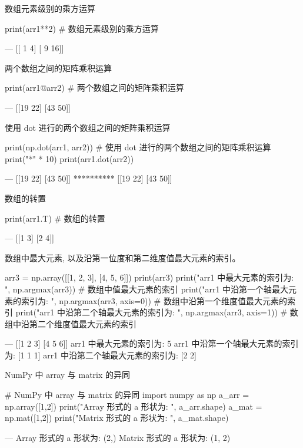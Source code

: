 数组元素级别的乘方运算 

\begin{python}
print(arr1**2)     # 数组元素级别的乘方运算 

---
[[ 1  4]
 [ 9 16]]
\end{python}

两个数组之间的矩阵乘积运算

\begin{python}
print(arr1@arr2)     # 两个数组之间的矩阵乘积运算

---
[[19 22]
 [43 50]]
\end{python}

使用 dot 进行的两个数组之间的矩阵乘积运算

\begin{python}
print(np.dot(arr1, arr2))   # 使用 dot 进行的两个数组之间的矩阵乘积运算
print("*" * 10)
print(arr1.dot(arr2))

---
[[19 22]
 [43 50]]
**********
[[19 22]
 [43 50]]
\end{python}

数组的转置

\begin{python}
print(arr1.T)      # 数组的转置

---
[[1 3]
 [2 4]]
\end{python}

数组中最大元素, 以及沿第一位度和第二维度值最大元素的索引。

\begin{python}
arr3 = np.array([[1, 2, 3], [4, 5, 6]])
print(arr3)
print("arr1 中最大元素的索引为: ", np.argmax(arr3))                    # 数组中值最大元素的索引
print("arr1 中沿第一个轴最大元素的索引为: ", np.argmax(arr3, axis=0))    # 数组中沿第一个维度值最大元素的索引
print("arr1 中沿第二个轴最大元素的索引为: ", np.argmax(arr3, axis=1))    # 数组中沿第二个维度值最大元素的索引

---
[[1 2 3]
 [4 5 6]]
arr1 中最大元素的索引为:  5
arr1 中沿第一个轴最大元素的索引为:  [1 1 1]
arr1 中沿第二个轴最大元素的索引为:  [2 2]
\end{python}

NumPy 中 array 与 matrix 的异同

\begin{python}
# NumPy 中 array 与 matrix 的异同
import numpy as np
a_arr = np.array([1,2])
print("Array 形式的 a 形状为: ", a_arr.shape)
a_mat = np.mat([1,2])
print("Matrix 形式的 a 形状为: ", a_mat.shape)

---
Array 形式的 a 形状为:  (2,)
Matrix 形式的 a 形状为:  (1, 2)
\end{python}


